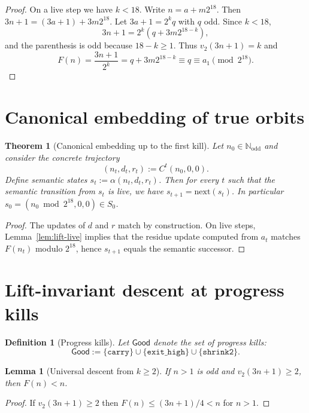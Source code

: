 \documentclass[11pt]{article}
\newtheorem{theorem}{Theorem}
\newtheorem{lemma}{Lemma}
\newtheorem{definition}{Definition}
\begin{document}
\begin{proof}
On a live step we have $k<18$. Write $n=a+m2^{18}$. Then $3n+1=(3a+1)+3m2^{18}$.
Let $3a+1=2^k q$ with $q$ odd. Since $k<18$,
\[
3n+1=2^k(q+3m2^{18-k}),
\]
and the parenthesis is odd because $18-k\ge 1$. Thus $v_2(3n+1)=k$ and
\[
F(n)=\frac{3n+1}{2^k}=q+3m2^{18-k}\equiv q\equiv a_1 \pmod{2^{18}}.
\]
\end{proof}

\section{Canonical embedding of true orbits}

\begin{theorem}[Canonical embedding up to the first kill]
\label{thm:L1-embedding}
Let $n_0\in\mathbb{N}_{\mathrm{odd}}$ and consider the concrete trajectory
\[
(n_t,d_t,r_t):=C^t(n_0,0,0).
\]
Define semantic states $s_t:=\alpha(n_t,d_t,r_t)$.
Then for every $t$ such that the semantic transition from $s_t$ is \emph{live}, we have $s_{t+1}=\mathrm{next}(s_t)$.
In particular $s_0=(n_0\bmod 2^{18},0,0)\in S_0$.
\end{theorem}

\begin{proof}
The updates of $d$ and $r$ match by construction.
On live steps, Lemma~\ref{lem:lift-live} implies that the residue update computed from $a_t$ matches $F(n_t)$ modulo
$2^{18}$, hence $s_{t+1}$ equals the semantic successor.
\end{proof}

\section{Lift-invariant descent at progress kills}

\begin{definition}[Progress kills]
Let $\mathsf{Good}$ denote the set of progress kills:
\[
\mathsf{Good} := \{\texttt{carry}\}\cup\{\texttt{exit\_high}\}\cup\{\texttt{shrink2}\}.
\]
\end{definition}

\begin{lemma}[Universal descent from $k\ge 2$]
If $n>1$ is odd and $v_2(3n+1)\ge 2$, then $F(n)<n$.
\end{lemma}

\begin{proof}
If $v_2(3n+1)\ge 2$ then $F(n)\le (3n+1)/4 < n$ for $n>1$.
\end{proof}
\end{document}
